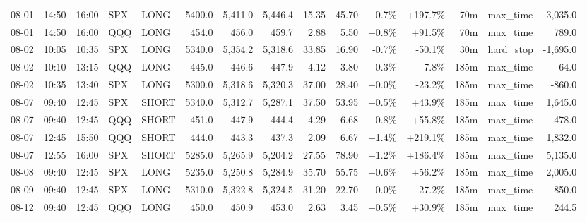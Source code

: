 \documentclass[11pt,a4paper,twoside]{article}
\begin{document}
\begin{landscape}
\begin{center}
\begin{longtable}{>{\color{txtmain}}l l l l l r r r r r r r r >{\color{txtmain}}l r}
08-01 & 14:50 & 16:00 & SPX & LONG & 5400.0 & 5,411.0 & 5,446.4 & 15.35 & 45.70 & \textcolor{wingreen}{+0.7\%} & \textcolor{wingreen}{+197.7\%} & 70m & max\_time & \textcolor{wingreen}{3,035.0} \\
08-01 & 14:50 & 16:00 & QQQ & LONG & 454.0 & 456.0 & 459.7 & 2.88 & 5.50 & \textcolor{wingreen}{+0.8\%} & \textcolor{wingreen}{+91.5\%} & 70m & max\_time & \textcolor{wingreen}{789.0} \\
08-02 & 10:05 & 10:35 & SPX & LONG & 5340.0 & 5,354.2 & 5,318.6 & 33.85 & 16.90 & \textcolor{lossred}{-0.7\%} & \textcolor{lossred}{-50.1\%} & 30m & hard\_stop & \textcolor{lossred}{-1,695.0} \\
08-02 & 10:10 & 13:15 & QQQ & LONG & 445.0 & 446.6 & 447.9 & 4.12 & 3.80 & \textcolor{wingreen}{+0.3\%} & \textcolor{lossred}{-7.8\%} & 185m & max\_time & \textcolor{lossred}{-64.0} \\
08-02 & 10:35 & 13:40 & SPX & LONG & 5300.0 & 5,318.6 & 5,320.3 & 37.00 & 28.40 & \textcolor{wingreen}{+0.0\%} & \textcolor{lossred}{-23.2\%} & 185m & max\_time & \textcolor{lossred}{-860.0} \\
08-07 & 09:40 & 12:45 & SPX & SHORT & 5340.0 & 5,312.7 & 5,287.1 & 37.50 & 53.95 & \textcolor{wingreen}{+0.5\%} & \textcolor{wingreen}{+43.9\%} & 185m & max\_time & \textcolor{wingreen}{1,645.0} \\
08-07 & 09:40 & 12:45 & QQQ & SHORT & 451.0 & 447.9 & 444.4 & 4.29 & 6.68 & \textcolor{wingreen}{+0.8\%} & \textcolor{wingreen}{+55.8\%} & 185m & max\_time & \textcolor{wingreen}{478.0} \\
08-07 & 12:45 & 15:50 & QQQ & SHORT & 444.0 & 443.3 & 437.3 & 2.09 & 6.67 & \textcolor{wingreen}{+1.4\%} & \textcolor{wingreen}{+219.1\%} & 185m & max\_time & \textcolor{wingreen}{1,832.0} \\
08-07 & 12:55 & 16:00 & SPX & SHORT & 5285.0 & 5,265.9 & 5,204.2 & 27.55 & 78.90 & \textcolor{wingreen}{+1.2\%} & \textcolor{wingreen}{+186.4\%} & 185m & max\_time & \textcolor{wingreen}{5,135.0} \\
08-08 & 09:40 & 12:45 & SPX & LONG & 5235.0 & 5,250.8 & 5,284.9 & 35.70 & 55.75 & \textcolor{wingreen}{+0.6\%} & \textcolor{wingreen}{+56.2\%} & 185m & max\_time & \textcolor{wingreen}{2,005.0} \\
08-09 & 09:40 & 12:45 & SPX & LONG & 5310.0 & 5,322.8 & 5,324.5 & 31.20 & 22.70 & \textcolor{wingreen}{+0.0\%} & \textcolor{lossred}{-27.2\%} & 185m & max\_time & \textcolor{lossred}{-850.0} \\
08-12 & 09:40 & 12:45 & QQQ & LONG & 450.0 & 450.9 & 453.0 & 2.63 & 3.45 & \textcolor{wingreen}{+0.5\%} & \textcolor{wingreen}{+30.9\%} & 185m & max\_time & \textcolor{wingreen}{244.5} \\

\end{longtable}
\end{center}
\end{landscape}
\end{document}
